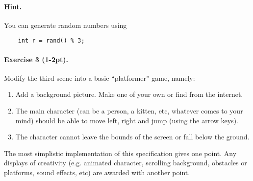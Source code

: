 \documentclass{article}
\newenvironment{exercise}[2]{\paragraph{Exercise #1 (#2pt).} }{}
\begin{document}
\paragraph{Hint.} You can generate random numbers using
\begin{lstlisting}
	int r = rand() % 3;
\end{lstlisting}

\begin{exercise}{3}{1-2}
Modify the third scene into a basic ``platformer'' game, namely:
\begin{enumerate}
\item Add a background picture. Make one of your own or find from the internet.
\item The main character (can be a person, a kitten, etc, whatever comes to your mind) should be able to move left, right and jump (using the arrow keys).
\item The character cannot leave the bounds of the screen or fall below the ground.
\end{enumerate}
The most simplistic implementation of this specification gives one point. Any displays of creativity (e.g. animated character, scrolling background, obstacles or platforms, sound effects, etc) are awarded with another point.

\end{exercise}
\end{document}
